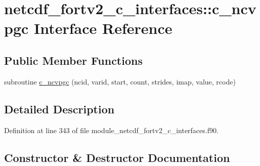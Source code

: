 \hypertarget{interfacenetcdf__fortv2__c__interfaces_1_1c__ncvpgc}{}\section{netcdf\+\_\+fortv2\+\_\+c\+\_\+interfaces\+:\+:c\+\_\+ncvpgc Interface Reference}
\label{interfacenetcdf__fortv2__c__interfaces_1_1c__ncvpgc}
\subsection*{Public Member Functions}
\begin{DoxyCompactItemize}
\item 
subroutine \hyperlink{interfacenetcdf__fortv2__c__interfaces_1_1c__ncvpgc_a5a7465d54e7ea776ade1909d3bb590d6}{c\+\_\+ncvpgc} (ncid, varid, start, count, strides, imap, value, rcode)
\end{DoxyCompactItemize}


\subsection{Detailed Description}


Definition at line 343 of file module\+\_\+netcdf\+\_\+fortv2\+\_\+c\+\_\+interfaces.\+f90.



\subsection{Constructor \& Destructor Documentation}
\mbox{\label{interfacenetcdf__fortv2__c__interfaces_1_1c__ncvpgc_a5a7465d54e7ea776ade1909d3bb590d6}} 
